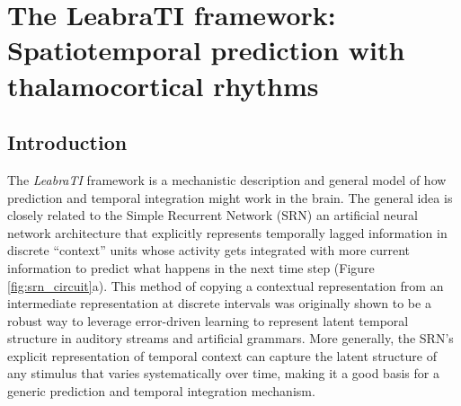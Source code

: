 \documentclass[dwyatte_dissertation.tex]{subfiles}
\begin{document}
\chapter{The LeabraTI framework: Spatiotemporal prediction with thalamocortical rhythms}
\label{chap:leabrati}

%
%
%


\section{Introduction}
The \textit{LeabraTI} framework is a mechanistic description and general model of how prediction and temporal integration might work in the brain. The general idea is closely related to the Simple Recurrent Network (SRN) \cite{Elman90,Servan-SchreiberCleeremansMcClelland91}  an artificial neural network architecture that explicitly represents temporally lagged information in discrete ``context'' units whose activity gets integrated with more current information to predict what happens in the next time step (Figure \ref{fig:srn_circuit}a). This method of copying a contextual representation from an intermediate representation at discrete intervals was originally shown to be a robust way to leverage error-driven learning to represent latent temporal structure in auditory streams and artificial grammars. More generally, the SRN's explicit representation of temporal context can capture the latent structure of any stimulus that varies systematically over time, making it a good basis for a generic prediction and temporal integration mechanism.
\end{document}

